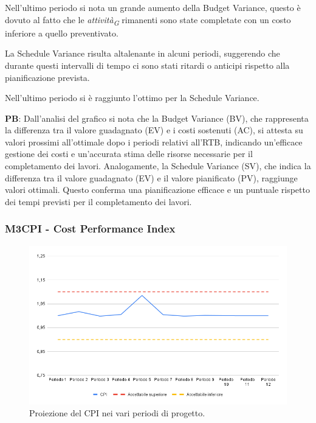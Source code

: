Nell'ultimo periodo si nota un grande aumento della Budget Variance, questo è dovuto al fatto che le \textit{attività}\textsubscript{\textit{G}} rimanenti sono state completate con un costo inferiore a quello preventivato. 

\vspace{0.2cm}
La Schedule Variance risulta altalenante in alcuni periodi, suggerendo che durante questi intervalli di tempo ci sono stati ritardi o anticipi rispetto alla pianificazione prevista.

\vspace{0.2cm}

Nell'ultimo periodo si è raggiunto l'ottimo per la Schedule Variance. 

\vspace{0.2cm}
\textbf{PB}: Dall'analisi del grafico si nota che la Budget Variance (BV), che rappresenta la differenza tra il valore guadagnato (EV) e i costi sostenuti (AC), si attesta su valori prossimi all'ottimale dopo i periodi relativi all'RTB, indicando un'efficace gestione dei costi e un'accurata stima delle risorse necessarie per il completamento dei lavori.
Analogamente, la Schedule Variance (SV), che indica la differenza tra il valore guadagnato (EV) e il valore pianificato (PV), raggiunge valori ottimali. Questo conferma una pianificazione efficace e un puntuale rispetto dei tempi previsti per il completamento dei lavori.

\subsubsection{M3CPI - Cost Performance Index}

\vspace{0.3cm}

\begin{figure}[H]
    \centering
    \includegraphics[width=1\textwidth]{../Images/PianoDiQualifica/M3CPI.png}
    \caption{Proiezione del CPI nei vari periodi di progetto.}
    \label{fig:6}
\end{figure}

